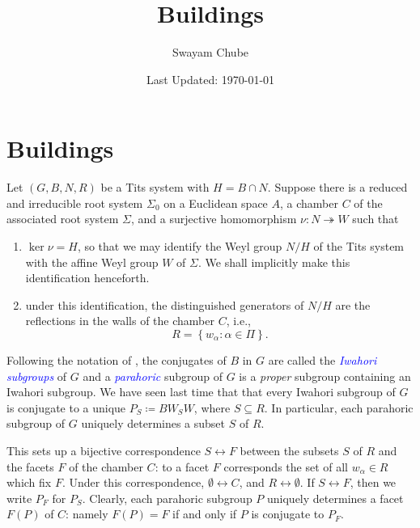 \documentclass{article}
\title{Buildings}
\author{Swayam Chube}
\date{Last Updated: \today}
\theoremstyle{thmstyle}
\theoremstyle{defstyle}
\newcommand{\onto}{\twoheadrightarrow}
\newcommand{\define}[1]{\textcolor{blue}{\textit{#1}}}
\begin{document}
\maketitle

\setcounter{section}{3}
\section{Buildings}

Let $(G, B, N, R)$ be a Tits system with $H = B\cap N$. Suppose there is a reduced and irreducible root system $\Sigma_0$ on a Euclidean space $A$, a chamber $C$ of the associated root system $\Sigma$, and a surjective homomorphism $\nu: N\onto W$ such that 
\begin{enumerate}[label=(\roman*)]
    \item $\ker\nu = H$, so that we may identify the Weyl group $N/H$ of the Tits system with the affine Weyl group $W$ of $\Sigma$. We shall implicitly make this identification henceforth.
    \item under this identification, the distinguished generators of $N/H$ are the reflections in the walls of the chamber $C$, i.e., 
    \begin{equation*}
        R = \left\{w_\alpha\colon\alpha\in\Pi\right\}.
    \end{equation*}
\end{enumerate}
Following the notation of \cite{macdonald-spherical-functions}, the conjugates of $B$ in $G$ are called the \define{Iwahori subgroups} of $G$ and a \define{parahoric} subgroup of $G$ is a \emph{proper} subgroup containing an Iwahori subgroup. We have seen last time that that every Iwahori subgroup of $G$ is conjugate to a unique $P_S \coloneq BW_SW$, where $S\subseteq R$. In particular, each parahoric subgroup of $G$ uniquely determines a subset $S$ of $R$.

This sets up a bijective correspondence $S\longleftrightarrow F$ between the subsets $S$ of $R$ and the facets $F$ of the chamber $C$: to a facet $F$ corresponds the set of all $w_\alpha\in R$ which fix $F$. Under this correspondence, $\emptyset\longleftrightarrow C$, and $R\longleftrightarrow\emptyset$. If $S\longleftrightarrow F$, then we write $P_F$ for $P_S$. Clearly, each parahoric subgroup $P$ uniquely determines a facet $F(P)$ of $C$: namely $F(P) = F$ if and only if $P$ is conjugate to $P_F$.
\end{document}
